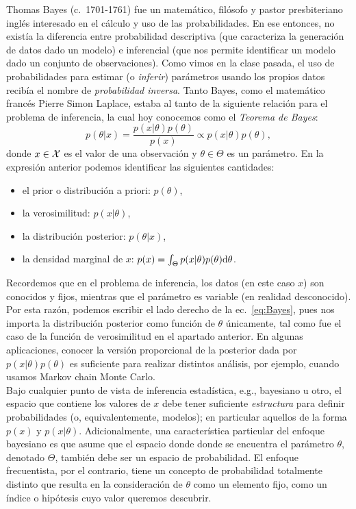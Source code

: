 Thomas Bayes (c.~1701-1761) fue un matemático, filósofo y pastor presbiteriano inglés interesado en el cálculo y uso de las probabilidades. En ese entonces, no existía la diferencia entre probabilidad descriptiva (que caracteriza la generación de datos dado un modelo) e inferencial (que nos permite identificar un modelo dado un conjunto de observaciones). Como vimos en la clase pasada, el uso de probabilidades para estimar (o \emph{inferir}) parámetros usando los propios datos recibía el nombre de \emph{probabilidad inversa}. Tanto Bayes, como el matemático francés Pierre Simon Laplace, estaba al tanto de la siguiente relación para el problema de inferencia, la cual hoy conocemos como el \emph{Teorema de Bayes}:
\begin{equation}
	p(\theta|x) = \frac{p(x|\theta)p(\theta)}{p(x)} \propto p(x|\theta)p(\theta),\label{eq:Bayes}
\end{equation}
donde $x\in{\mathcal X}$ es el valor de una observación y $\theta\in\Theta$ es un parámetro. En la expresión anterior podemos identificar las siguientes cantidades:
\begin{itemize}
	\item el prior o distribución a priori: $p(\theta)$,
	\item la verosimilitud: $p(x|\theta)$,
	\item la distribución posterior: $p(\theta|x)$,
	\item la densidad marginal de $x$: $p(x) = \int_\Theta p(x|\theta)p(\theta){\text d}\theta$.
\end{itemize}
Recordemos que en el problema de inferencia, los datos (en este caso $x$) son conocidos y fijos, mientras que el parámetro es variable (en realidad desconocido). Por esta razón, podemos escribir el lado derecho de la ec.~\eqref{eq:Bayes}, pues nos importa la distribución posterior como función de $\theta$ únicamente, tal como fue el caso de la función de verosimilitud en el apartado anterior. En algunas aplicaciones, conocer la versión proporcional de la posterior dada por $p(x|\theta)p(\theta)$ es suficiente para realizar distintos análisis, por ejemplo, cuando usamos Markov chain Monte Carlo.\\

Bajo cualquier punto de vista de inferencia estadística, e.g., bayesiano u otro, el espacio que contiene los valores de $x$ debe tener suficiente \emph{estructura} para definir probabilidades (o, equivalentemente, modelos); en particular aquellos de la forma $p(x)$ y $p(x|\theta)$. Adicionalmente, una característica particular del enfoque bayesiano es que asume que el espacio donde donde se encuentra el parámetro $\theta$, denotado $\Theta$, también debe ser un espacio de probabilidad. El enfoque frecuentista, por el contrario, tiene un concepto de probabilidad totalmente distinto que resulta en la consideración de $\theta$ como un elemento fijo, como un índice o hipótesis cuyo valor queremos descubrir.\\

